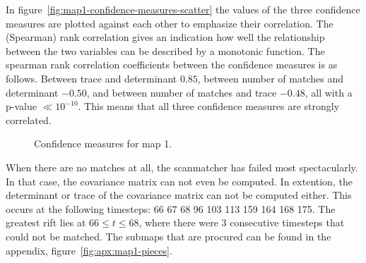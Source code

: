 In figure~\ref{fig:map1-confidence-measures-scatter} the values of the three confidence measures are plotted against each other to emphasize their correlation. The (Spearman) rank correlation gives an indication how well the relationship between the two variables can be described by a monotonic function. The spearman rank correlation coefficients between the confidence measures is as follows. Between trace and determinant $0.85$, between number of matches and determinant $-0.50$, and between number of matches and trace $-0.48$, all with a p-value $\ll 10^{-10}$. This means that all three confidence measures are strongly correlated.

\begin{figure}[ht]
  \centering
  \caption{Confidence measures for map 1.}
  \label{fig:map1-confidence-measures}
\end{figure}

When there are no matches at all, the scanmatcher has failed most spectacularly. In that case, the covariance matrix can not even be computed. In extention, the determinant or trace of the covariance matrix can not be computed either. This occurs at the following timesteps: 66  67  68  96 103 113 159 164 168 175. The greatest rift lies at $66 \le t \le68$, where there were 3 consecutive timesteps that could not be matched. The submaps that are procured can be found in the appendix, figure~\ref{fig:apx:map1-pieces}. 

